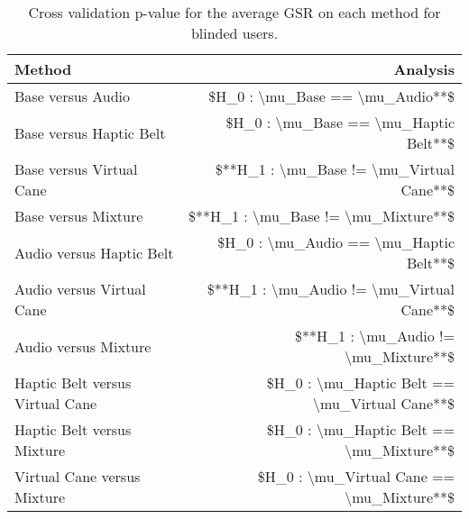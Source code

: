 
\begin{table}[!htb]
\centering
\caption{Cross validation p-value for the average GSR on each method for blinded users.}
\label{tab:lsd_gsr}
\begin{tabular}{lr}
\toprule
                         Method &                                      Analysis \\
\midrule
              Base versus Audio &               \$H\_0 : \textbackslash mu\_Base == \textbackslash mu\_Audio**\$ \\
        Base versus Haptic Belt &         \$H\_0 : \textbackslash mu\_Base == \textbackslash mu\_Haptic Belt**\$ \\
       Base versus Virtual Cane &      \$**H\_1 : \textbackslash mu\_Base != \textbackslash mu\_Virtual Cane**\$ \\
            Base versus Mixture &           \$**H\_1 : \textbackslash mu\_Base != \textbackslash mu\_Mixture**\$ \\
       Audio versus Haptic Belt &        \$H\_0 : \textbackslash mu\_Audio == \textbackslash mu\_Haptic Belt**\$ \\
      Audio versus Virtual Cane &     \$**H\_1 : \textbackslash mu\_Audio != \textbackslash mu\_Virtual Cane**\$ \\
           Audio versus Mixture &          \$**H\_1 : \textbackslash mu\_Audio != \textbackslash mu\_Mixture**\$ \\
Haptic Belt versus Virtual Cane & \$H\_0 : \textbackslash mu\_Haptic Belt == \textbackslash mu\_Virtual Cane**\$ \\
     Haptic Belt versus Mixture &      \$H\_0 : \textbackslash mu\_Haptic Belt == \textbackslash mu\_Mixture**\$ \\
    Virtual Cane versus Mixture &     \$H\_0 : \textbackslash mu\_Virtual Cane == \textbackslash mu\_Mixture**\$ \\
\bottomrule
\end{tabular}
\end{table}

